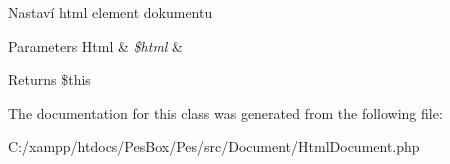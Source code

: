 Nastaví html element dokumentu 
\begin{DoxyParams}[1]{Parameters}
Html & {\em \$html} & \\
\hline
\end{DoxyParams}
\begin{DoxyReturn}{Returns}
\$this 
\end{DoxyReturn}


The documentation for this class was generated from the following file\+:\begin{DoxyCompactItemize}
\item 
C\+:/xampp/htdocs/\+Pes\+Box/\+Pes/src/\+Document/Html\+Document.\+php\end{DoxyCompactItemize}
